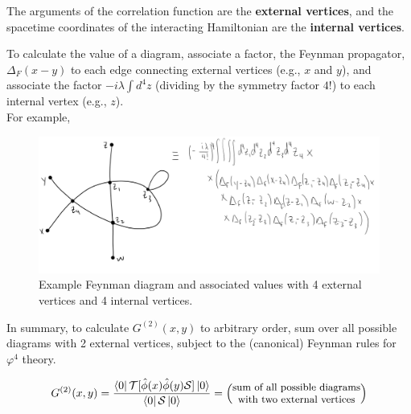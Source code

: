 \noindent The arguments of the correlation function are the \textbf{external vertices}, and the spacetime coordinates of the interacting Hamiltonian are the \textbf{internal vertices}.

\noindent To calculate the value of a diagram, associate a factor, the Feynman propagator, $\Delta_F(x-y)$ to each edge connecting external vertices (e.g., $x$ and $y$), and associate the factor $-i\lambda \int d^4 z$ (dividing by the symmetry factor $4!$) to each internal vertex (e.g., $z$). \\

\noindent For example,

\begin{figure}[H]
	\centering
	\includegraphics[scale=0.3]{images/4int4ext.png}
	\caption{Example Feynman diagram and associated values with 4 external vertices and 4 internal vertices.}
\end{figure}

\noindent In summary, to calculate $G^{(2)}(x,y)$ to arbitrary order, sum over all possible diagrams with 2 external vertices, subject to the (canonical) Feynman rules for $\varphi^4$ theory.

\begin{equation}
G^{(2)}(x,y) = \frac{\bra{0}\mathcal{T}[\hat{\phi}(x)\hat{\phi}(y)\mathcal{S}]\ket{0}}{\bra{0}\mathcal{S}\ket{0}} = \left(\text{\small {\stackanchor{sum of all possible diagrams}{with two external vertices}}}\right)
\end{equation}

